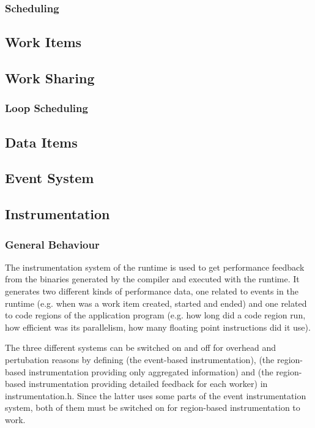 \subsubsection{Scheduling}
\subsection{Work Items}
\subsection{Work Sharing}
\subsubsection{Loop Scheduling}
\subsection{Data Items}
\subsection{Event System}

\subsection{Instrumentation}
\label{sec:runtime.instrumentation}

\subsubsection{General Behaviour}
\label{sec:runtime.instrumentation.general.behaviour}

The instrumentation system of the runtime is used to get performance feedback
from the binaries generated by the compiler and executed with the runtime. It
generates two different kinds of performance data, one related to events in the
runtime (e.g. when was a work item created, started and ended) and one related
to code regions of the application program (e.g. how long did a code region run,
how efficient was its parallelism, how many floating point instructions did it
use).

The three different systems can be switched on and off for overhead and
pertubation reasons by defining  (the
event-based instrumentation), 
(the region-based instrumentation providing only aggregated information) and
 (the region-based
instrumentation providing detailed feedback for each worker) in instrumentation.h. 
Since the latter uses some parts of the event instrumentation system, both of them 
must be switched on for region-based instrumentation to work.

